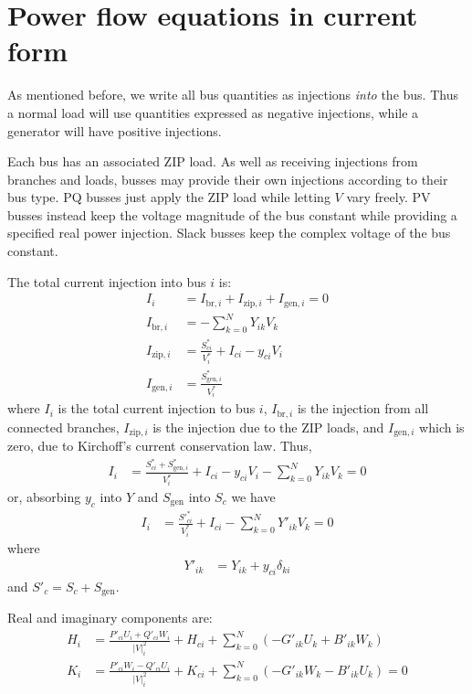 \documentclass[11pt]{article}
\newcommand{\Vr}{\ensuremath{U}}
\newcommand{\Vi}{\ensuremath{W}}
\newcommand{\Ir}{\ensuremath{H}}
\newcommand{\Ii}{\ensuremath{K}}
\begin{document}
\section{Power flow equations in current form}
As mentioned before, we write all bus quantities as injections \emph{into} the bus. Thus a normal load will use quantities expressed as negative injections, while a generator will have positive injections.

Each bus has an associated ZIP load. As well as receiving injections from branches and loads, busses may provide their own injections according to their bus type. PQ busses just apply the ZIP load while letting $V$ vary freely. PV busses instead keep the voltage magnitude of the bus constant while providing a specified real power injection. Slack busses keep the complex voltage of the bus constant.

The total current injection into bus $i$ is:
\begin{align}
I_i &= I_{\text{br}, i} + I_{\text{zip},i} + I_{\text{gen}, i} = 0\\
I_{\text{br},i} &= -\sum_{k=0}^NY_{ik}V_k \\
I_{\text{zip},i} &= \frac{S^*_{ci}}{V^*_i} + I_{ci} - y_{ci}V_i \\
I_{\text{gen},i} &= \frac{S^*_{\text{gen},i}}{V^*_i}
\end{align}
where $I_i$ is the total current injection to bus $i$, $I_{\text{br},i}$ is the injection from all connected branches, $I_{\text{zip},i}$ is the injection due to the ZIP loads, and $I_{\text{gen},i}$
which is zero, due to Kirchoff's current conservation law. Thus,
\begin{align}
I_i &= \frac{S^*_{ci} + S^*_{\text{gen},i}}{V^*_i} + I_{ci} - y_{ci}V_i - \sum_{k=0}^NY_{ik}V_k = 0
\end{align}
or, absorbing $y_c$ into $Y$ and $S_{\text{gen}}$ into $S_c$ we have
\begin{align}
I_i &= \frac{S'^*_{ci}}{V^*_i} + I_{ci} - \sum_{k=0}^NY'_{ik}V_k = 0
\end{align}
where
\begin{align}
	Y'_{ik} &= Y_{ik} + y_{ci}\delta_{ki}
\end{align}
and $S'_c = S_c + S_{\text{gen}}$.

Real and imaginary components are:
\begin{align}
\Ir_i &= \frac{P'_{ci}\Vr_i + Q'_{ci}\Vi_i}{|V|^2_i} + \Ir_{ci} + \sum_{k=0}^N\left(-G'_{ik}\Vr_k + B'_{ik}\Vi_k\right) \\
\Ii_i &= \frac{P'_{ci}\Vi_i - Q'_{ci}\Vr_i}{|V|^2_i} + \Ii_{ci} + \sum_{k=0}^N\left(-G'_{ik}\Vi_k - B'_{ik}\Vr_k\right) = 0
\end{align}
\end{document}
